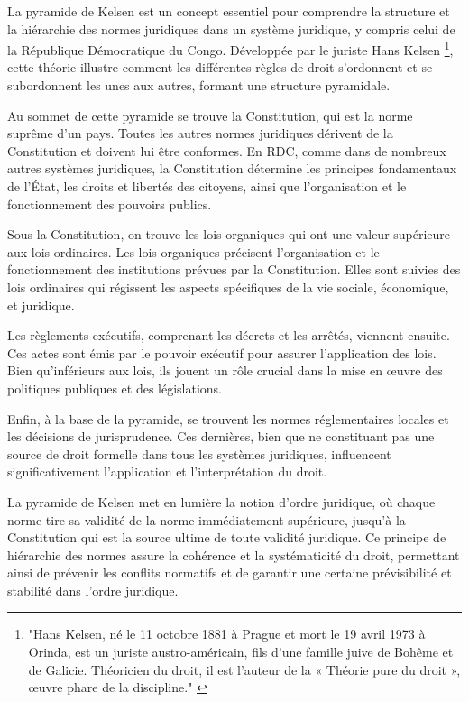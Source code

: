 La pyramide de Kelsen est un concept essentiel pour comprendre la structure et la hiérarchie des normes juridiques dans un système juridique, y compris celui de la République Démocratique du Congo. Développée par le juriste Hans Kelsen \footnote{"Hans Kelsen, né le 11 octobre 1881 à Prague et mort le 19 avril 1973 à Orinda, est un juriste austro-américain, fils d'une famille juive de Bohême et de Galicie. Théoricien du droit, il est l'auteur de la « Théorie pure du droit », œuvre phare de la discipline." \cite{frwiki:213425509}}, cette théorie illustre comment les différentes règles de droit s'ordonnent et se subordonnent les unes aux autres, formant une structure pyramidale.

Au sommet de cette pyramide se trouve la Constitution, qui est la norme suprême d'un pays. Toutes les autres normes juridiques dérivent de la Constitution et doivent lui être conformes. En RDC, comme dans de nombreux autres systèmes juridiques, la Constitution détermine les principes fondamentaux de l'État, les droits et libertés des citoyens, ainsi que l'organisation et le fonctionnement des pouvoirs publics.

Sous la Constitution, on trouve les lois organiques qui ont une valeur supérieure aux lois ordinaires. Les lois organiques précisent l'organisation et le fonctionnement des institutions prévues par la Constitution. Elles sont suivies des lois ordinaires qui régissent les aspects spécifiques de la vie sociale, économique, et juridique.

Les règlements exécutifs, comprenant les décrets et les arrêtés, viennent ensuite. Ces actes sont émis par le pouvoir exécutif pour assurer l'application des lois. Bien qu'inférieurs aux lois, ils jouent un rôle crucial dans la mise en œuvre des politiques publiques et des législations.

Enfin, à la base de la pyramide, se trouvent les normes réglementaires locales et les décisions de jurisprudence. Ces dernières, bien que ne constituant pas une source de droit formelle dans tous les systèmes juridiques, influencent significativement l'application et l'interprétation du droit.

La pyramide de Kelsen met en lumière la notion d'ordre juridique, où chaque norme tire sa validité de la norme immédiatement supérieure, jusqu'à la Constitution qui est la source ultime de toute validité juridique. Ce principe de hiérarchie des normes assure la cohérence et la systématicité du droit, permettant ainsi de prévenir les conflits normatifs et de garantir une certaine prévisibilité et stabilité dans l'ordre juridique.

